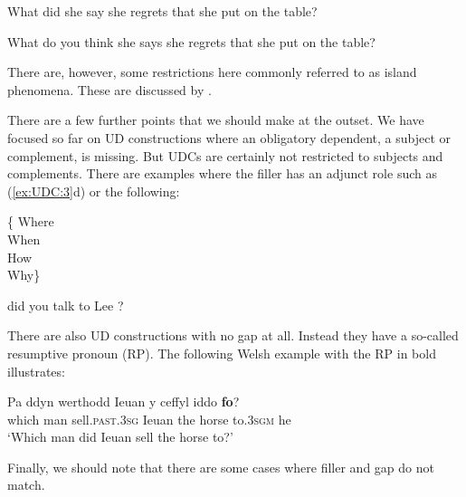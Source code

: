 \documentclass[output=paper
                ,modfonts
                ,nonflat
	        ,collection
	        ,collectionchapter
	        ,collectiontoclongg
 	        ,biblatex
                ,babelshorthands
                ,newtxmath
                ,draftmode
                ,colorlinks, citecolor=brown
]{./langsci/langscibook}
\begin{document}
{\begin{exe}
\begin{xlist}
\ex What did she say she regrets that she put  \gap{} on the table?

\ex What do you think she says she regrets that she put \gap{} on the table?
\end{xlist}
\end{exe}

\noindent
There are, however, some restrictions here commonly referred to as
island phenomena. These are discussed by
.

There are a few further points that we should make at the outset. We
have focused so far on UD constructions where an obligatory dependent,
a subject or complement,
is missing. But UDCs are certainly not restricted to subjects and
complements.
There are examples where the filler
has an adjunct role such as (\ref{ex:UDC:3}d) or the following:

\begin{exe}
\ex \label{ex:UDC:6}
\begin{avm} 
  \{ \normalfont Where\\ \normalfont When\\ \normalfont How\\
  \normalfont Why\}
\end{avm}
did you talk to Lee \gap{}?
 \end{exe}
 
\noindent
There are also UD
constructions with no gap at all. Instead they have a so-called
resumptive pronoun (RP). The following Welsh example with the RP in bold
illustrates:

\begin{exe}
\ex \label{ex:UDC:7}
\gll Pa ddyn werthodd Ieuan y ceffyl iddo \textbf{fo}?\\
which man sell.\textsc{past.3sg} Ieuan the horse to\textsc{.3sgm} he\\
\glt `Which man did Ieuan sell the horse to?'
\end{exe}

\noindent
Finally, we should note that there are some cases where filler and gap
do not match.

\begin{exe} \ex \begin{xlist} \label{ex:UDC:8}

\end{xlist}
\end{exe}

}
\end{document}
